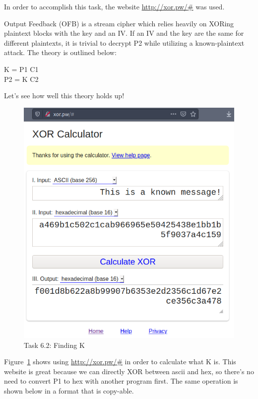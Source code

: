 \documentclass[12pt]{article}
\begin{document}
In order to accomplish this task, the website \url{http://xor.pw/#} was used.

Output Feedback (OFB) is a stream cipher which relies heavily on XORing plaintext blocks with the key and an IV. If an IV and the key are the same for different plaintexts, it is trivial to decrypt P2 while utilizing a known-plaintext attack. The theory is outlined below:

\centering
K = P1 \bigoplus C1\\
P2 = K \bigoplus C2

\raggedright 
 
Let's see how well this theory holds up!

\begin{figure}[H]
    \begin{center}
        \includegraphics[scale=0.55]{t6p2.1.png}
    \end{center}{}
    \caption{Task 6.2: Finding K}
    \label{fig:t6p2.1}
\end{figure}

Figure~\ref{fig:t6p2.1} shows using \url{http://xor.pw/#} in order to calculate what K is. This website is great because we can directly XOR between ascii and hex, so there's no need to convert P1 to hex with another program first. The same operation is shown below in a format that is copy-able.
\end{document}
